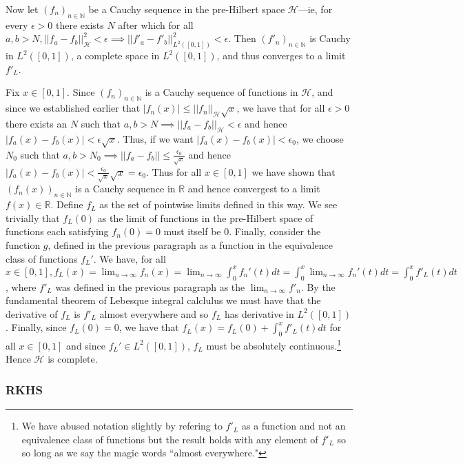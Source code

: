 \documentclass[12pt]{article}
\begin{document}
Now let $(f_n)_{n \in \mathbb{N}}$ be a Cauchy sequence in the pre-Hilbert space $\mathcal{H}$---ie, for every $\epsilon > 0$ there exists $N$ after which for all $a, b > N, ||f_a - f_b||^2_\mathcal{H} < \epsilon \implies ||f'_a - f'_b||^2_{L^2([0,1])} < \epsilon.$ Then $(f'_n)_{n \in \mathbb{N}}$ is Cauchy in $L^2([0,1])$, a complete space in $L^2([0,1])$, and thus converges to a limit $f'_L$.

Fix $x\in [0,1]$. Since $(f_n)_{n \in \mathbb{N}}$ is a Cauchy sequence of functions in $\mathcal{H}$, and since we established earlier that $|f_n(x)| \leq ||f_n||_\mathcal{H} \sqrt{x}$, we have that for all $\epsilon > 0$ there exists an $N$ such that $a,b > N \implies ||f_a - f_b||_\mathcal{H} < \epsilon$ and hence  $|f_a(x) - f_b(x)| < \epsilon \sqrt{x}$. Thus, if we want $|f_a(x) - f_b(x)| < \epsilon_0$, we choose $N_0$ such that $a,b > N_0 \implies ||f_a - f_b || \leq \frac{\epsilon_0}{\sqrt{x}}$ and hence $|f_a(x) - f_b(x)| < \frac{\epsilon_0}{\sqrt{x}}\sqrt{x} = \epsilon_0.$ Thus for all $x \in [0,1]$ we have shown that $(f_n(x))_{n \in \mathbb{N}}$ is a Cauchy sequence in $\mathbb{R}$ and hence convergest to a limit $f(x) \in \mathbb{R}$. Define $f_L$ as the set of pointwise limits defined in this way. We see trivially that $f_L(0)$ as the limit of functions in the pre-Hilbert space of functions each satisfying $f_n(0) = 0$ must itself be 0. Finally, consider the function $g$, defined in the previous paragraph as a function in the equivalence class of functions $f_L'$. We have, for all $x \in [0,1], f_L(x) = \lim_{n\rightarrow \infty} f_n(x) = \lim_{n\rightarrow \infty} \int_0^x f_n'(t)dt = \int_0^x \lim_{n \rightarrow \infty} f_n'(t) dt = \int_0^x f'_L(t) dt$, where $f'_L$ was defined in the previous paragraph as the $\lim_{n\rightarrow \infty} f'_n$. By the fundamental theorem of Lebesque integral calclulus we must have that the derivative of $f_L$ is $f'_L$ almost everywhere and so $f_L$ has derivative in $L^2([0,1])$. Finally, since $f_L(0) = 0$, we have that $f_L(x) = f_L(0) + \int_0^x f'_L(t) dt$ for all $x \in [0,1]$ and since $f_L'\in L^2([0,1])$, $f_L$ must be absolutely continuous.\footnote{We have abused notation slightly by refering to $f'_L$ as a function and not an equivalence class of functions but the result holds with any element of $f'_L$ so so long as we say the magic words ``almost everywhere."} Hence $\mathcal{H}$ is complete.

\subsubsection{RKHS}
\end{document}
